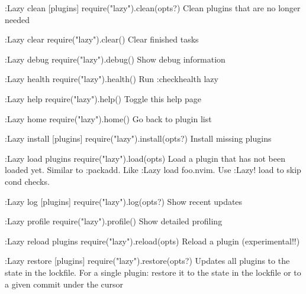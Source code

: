 \begin{listing}
  :Lazy clean [plugins]     require("lazy").clean(opts?)     Clean plugins that are
                                                             no longer needed

  :Lazy clear               require("lazy").clear()          Clear finished tasks

  :Lazy debug               require("lazy").debug()          Show debug information

  :Lazy health              require("lazy").health()         Run :checkhealth lazy

  :Lazy help                require("lazy").help()           Toggle this help page

  :Lazy home                require("lazy").home()           Go back to plugin list

  :Lazy install [plugins]   require("lazy").install(opts?)   Install missing plugins

  :Lazy load {plugins}      require("lazy").load(opts)       Load a plugin that has
                                                             not been loaded yet.
                                                             Similar to :packadd.
                                                             Like
                                                             :Lazy load foo.nvim.
                                                             Use :Lazy! load to skip
                                                             cond checks.

  :Lazy log [plugins]       require("lazy").log(opts?)       Show recent updates

  :Lazy profile             require("lazy").profile()        Show detailed profiling

  :Lazy reload {plugins}    require("lazy").reload(opts)     Reload a plugin
                                                             (experimental!!)

  :Lazy restore [plugins]   require("lazy").restore(opts?)   Updates all plugins to
                                                             the state in the
                                                             lockfile. For a single
                                                             plugin: restore it to
                                                             the state in the
                                                             lockfile or to a given
                                                             commit under the cursor


\end{listing}
